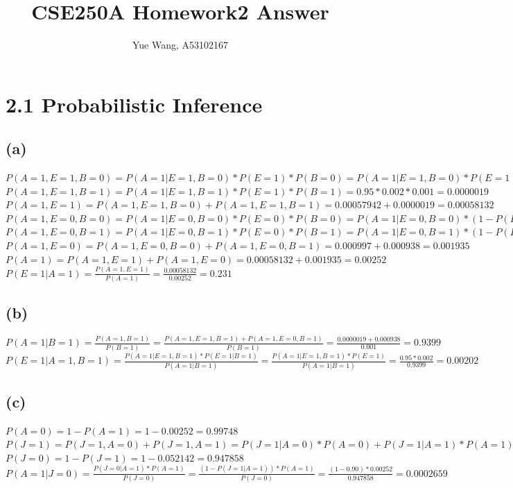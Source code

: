 \documentclass [11pt, a4paper, oneside] {article}
\author {Yue Wang, A53102167}
\title {CSE250A Homework2 Answer}
\begin{document}
\maketitle
\section *{2.1 Probabilistic Inference}
\subsection *{(a)}
$P(A=1, E=1, B=0)  = P(A=1|E=1, B=0)*P(E=1)*P(B=0) = P(A=1|E=1, B=0)*P(E=1)*(1-P(B=1)) = 0.29*0.002*(1-0.001) = 0.00057942$\\
$P(A=1, E=1, B=1) =  P(A=1|E=1, B=1)*P(E=1)*P(B=1) = 0.95*0.002*0.001 = 0.0000019$\\
$P(A=1, E=1) = P(A=1, E=1, B=0) + P(A=1, E=1, B=1) = 0.00057942 + 0.0000019 = 0.00058132$\\
$P(A=1, E=0, B=0) = P(A=1|E=0, B=0)*P(E=0)*P(B=0) = P(A=1|E=0, B=0)*(1-P(E=1))*(1-P(B=1)) = 0.001*(1-0.002)*(1-0.001) = 0.000997$\\
$P(A=1, E=0, B=1) = P(A=1|E=0, B=1)*P(E=0)*P(B=1) = P(A=1|E=0, B=1)*(1-P(E=1))*P(B=1) = 0.94*(1-0.002)*0.001 = 0.000938$\\
$P(A=1, E=0) = P(A=1, E=0, B=0) + P(A=1, E=0, B=1) = 0.000997 + 0.000938 = 0.001935$\\
$P(A=1) = P(A=1, E=1) + P(A=1, E=0) = 0.00058132 + 0.001935 = 0.00252$\\
$P(E=1|A=1) = \frac{P(A=1, E=1)}{P(A=1)} = \frac{0.00058132}{0.00252} = 0.231$\\
\subsection *{(b)}
$P(A=1|B=1) = \frac{P(A=1, B = 1)}{P(B=1)} = \frac{P(A=1, E=1, B=1) + P(A=1, E=0, B=1)}{P(B=1)} = \frac{0.0000019+0.000938}{0.001} = 0.9399$\\
$P(E=1|A=1, B=1) = \frac{P(A=1|E=1, B=1)*P(E=1|B=1)}{P(A=1|B=1)} = \frac{P(A=1|E=1, B=1)*P(E=1)}{P(A=1|B=1)} = \frac{0.95*0.002}{0.9399} = 0.00202$\\
\subsection *{(c)}
$P(A=0) = 1 - P(A=1) = 1 - 0.00252 = 0.99748$\\
$P(J=1) = P(J=1, A=0) + P(J=1, A=1) = P(J=1|A=0)*P(A=0) + P(J=1|A=1)*P(A=1) = 0.05*0.99748 + 0.90*0.00252 = 0.052142$\\
$P(J=0) = 1 - P(J=1) = 1 - 0.052142 = 0.947858$\\
$P(A=1|J=0) = \frac{P(J=0| A=1)*P(A=1)}{P(J=0)} = \frac{(1-P(J=1|A=1))*P(A=1)}{P(J=0)} = \frac{(1-0.90)*0.00252}{0.947858} = 0.0002659$\\
\end{document}
